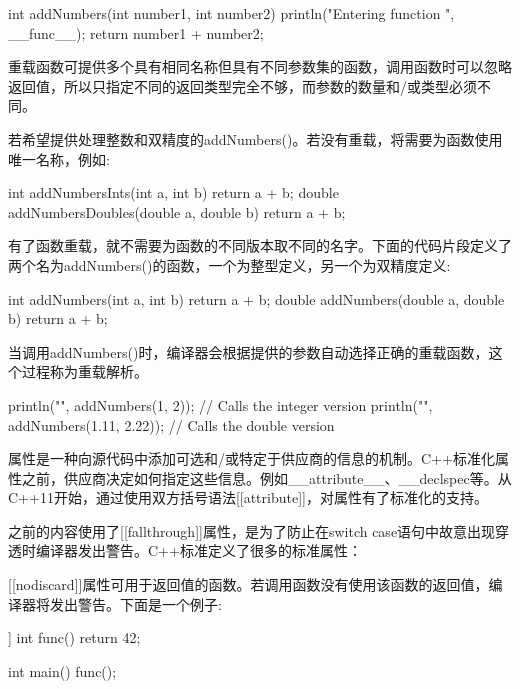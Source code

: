 \begin{cpp}
int addNumbers(int number1, int number2)
{
    println("Entering function {}", __func__);
    return number1 + number2;
}
\end{cpp}


重载函数可提供多个具有相同名称但具有不同参数集的函数，调用函数时可以忽略返回值，所以只指定不同的返回类型完全不够，而参数的数量和/或类型必须不同。

若希望提供处理整数和双精度的addNumbers()。若没有重载，将需要为函数使用唯一名称，例如:

\begin{cpp}
int addNumbersInts(int a, int b) { return a + b; }
double addNumbersDoubles(double a, double b) { return a + b; }
\end{cpp}

有了函数重载，就不需要为函数的不同版本取不同的名字。下面的代码片段定义了两个名为addNumbers()的函数，一个为整型定义，另一个为双精度定义:

\begin{cpp}
int addNumbers(int a, int b) { return a + b; }
double addNumbers(double a, double b) { return a + b; }
\end{cpp}

当调用addNumbers()时，编译器会根据提供的参数自动选择正确的重载函数，这个过程称为重载解析。

\begin{cpp}
println("{}", addNumbers(1, 2)); // Calls the integer version
println("{}", addNumbers(1.11, 2.22)); // Calls the double version
\end{cpp}


属性是一种向源代码中添加可选和/或特定于供应商的信息的机制。C++标准化属性之前，供应商决定如何指定这些信息。例如\_\_attribute\_\_、\_\_declspec等。从C++11开始，通过使用双方括号语法[[attribute]]，对属性有了标准化的支持。

之前的内容使用了[[fallthrough]]属性，是为了防止在switch case语句中故意出现穿透时编译器发出警告。C++标准定义了很多的标准属性：

\mySamllsection{[[nodiscard]]}

[[nodiscard]]属性可用于返回值的函数。若调用函数没有使用该函数的返回值，编译器将发出警告。下面是一个例子:

\begin{cpp}
[[nodiscard]] int func() { return 42; }

int main()
{
    func();
}
\end{cpp}

